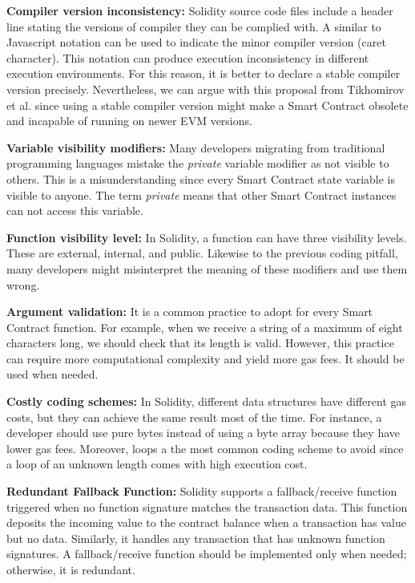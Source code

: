 \documentclass[a4paper,11pt]{article}
\begin{document}
\textbf{Compiler version inconsistency:}
Solidity source code files include a header line stating the versions of
compiler they can be complied with. A similar to Javascript notation can be used
to indicate the minor compiler version (caret character). This notation can
produce execution inconsistency in different execution environments. For this
reason, it is better to declare a stable compiler version precisely.
Nevertheless, we can argue with this proposal from Tikhomirov et al. since using
a stable compiler version might make a Smart Contract obsolete and incapable of
running on newer EVM versions.

\textbf{Variable visibility modifiers:}
Many developers migrating from traditional programming languages mistake the
\emph{private} variable modifier as not visible to others. This is a
misunderstanding since every Smart Contract state variable is visible to anyone.
The term \emph{private} means that other Smart Contract instances can not access
this variable.

\textbf{Function visibility level:}
In Solidity, a function can have three visibility levels. These are external,
internal, and public. Likewise to the previous coding pitfall, many developers
might misinterpret the meaning of these modifiers and use them wrong.

\textbf{Argument validation:}
It is a common practice to adopt for every Smart Contract function. For example,
when we receive a string of a maximum of eight characters long, we should check
that its length is valid. However, this practice can require more computational
complexity and yield more gas fees. It should be used when needed.

\textbf{Costly coding schemes:}
In Solidity, different data structures have different gas costs, but they can
achieve the same result most of the time. For instance, a developer should use
pure bytes instead of using a byte array because they have lower gas fees.
Moreover, loops a the most common coding scheme to avoid since a loop of an
unknown length comes with high execution cost.

\textbf{Redundant Fallback Function:}
Solidity supports a fallback/receive function triggered when no function
signature matches the transaction data. This function deposits the incoming
value to the contract balance when a transaction has value but no data.
Similarly, it handles any transaction that has unknown function signatures. A
fallback/receive function should be implemented only when needed; otherwise, it
is redundant.
\end{document}
